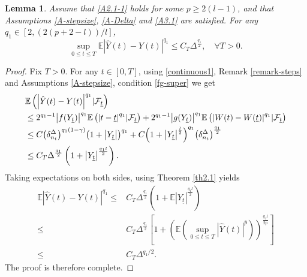 \documentclass[preprint,12pt,compress]{elsarticle}
\newtheorem{lemma}[theorem]{Lemma}%
\begin{document}
\begin{lemma}   \label{YYbar}
	Assume that \eqref{A2.1-1} holds for some $ p \ge 2(l-1)$, and that Assumptions \ref{A-stepsize}, \ref{A-Delta} and \ref{A3.1} are satisfied. For any ${q_1} \in [2, (2(p+2-l))/l]$, 
	\begin{equation*}
		\mathop {\sup }\limits_{0 \le t \le T} \mathbb{E}{\left| {\hat Y(t) - Y(t)} \right|^{{q_1}}} \le {C_T}{\Delta ^{\frac{{{q_1}}}{2}}}, \quad \forall T > 0.
	\end{equation*}
\end{lemma}
\begin{proof}
Fix $T > 0$. For any $t \in [0, T]$, using \eqref{continuous1}, Remark \ref{remark-steps} and Assumptions \ref{A-stepsize}, condition \eqref{fg-super} we get
\begin{equation*}
	\begin{split}
		&\mathbb{E}\left( {{{\left| {\hat Y(t) - Y(t)} \right|}^{{q_1}}}|{{\cal F}_{{\underline{t}}}}} \right) \\
		&\le {2^{{q_1} - 1}}{\left| {f({Y_{{\underline{t}}}})} \right|^{{q_1}}}\mathbb{E}\left( {{{\left| {t - {\underline{t}}} \right|}^{{q_1}}}|{{\cal F}_{{\underline{t}}}}} \right) + {2^{{q_1} - 1}}{\left| {g({Y_{{\underline{t}}}})} \right|^{{q_1}}}\mathbb{E}\left( {{{\left| {W(t) - W({\underline{t}})} \right|}^{{q_1}}}|{{\cal F}_{{\underline{t}}}}} \right) \\
		&\le C{\left( {\delta _{{n_t}}^\Delta } \right)^{{q_1}(1 - \gamma )}}{\left( {1 + \left| {{Y_{{\underline{t}}}}} \right|} \right)^{{q_1}}} + C{\left( {1 + {{\left| {{Y_{{\underline{t}}}}} \right|}^{\frac{l}{2}}}} \right)^{{q_1}}}{\left( {\delta _{{n_t}}^\Delta } \right)^{\frac{{{q_1}}}{2}}} \\
		&\le C_T{\Delta ^{\frac{{{q_1}}}{2}}}\left( {1 + {{\left| {{Y_{{\underline{t}}}}} \right|}^{\frac{{{q_1}l}}{2}}}} \right).
	\end{split}
\end{equation*}
Taking expectations on both sides, using Theorem \ref{th2.1} yields
\begin{equation*}
	\begin{split}
		\mathbb{E}{\left| {\hat Y(t) - Y(t)} \right|^{{q_1}}} 
		\le& {C_T}{\Delta ^{\frac{{{q_1}}}{2}}}\left( {1 + \mathbb{E}{{\left| {{Y_{{\underline{t}}}}} \right|}^{\frac{{{q_1}l}}{2}}}} \right)\\
		\le& {C_T}{\Delta ^{\frac{{{q_1}}}{2}}}\left[ {1 + {{\left( {\mathbb{E}\left( {\mathop {\sup }\limits_{0 \le t \le T} {{\left| {\hat Y(t)} \right|}^{\bar p}}} \right)} \right)}^{\frac{{{q_1}l}}{{2\bar p}}}}} \right] \\
		\le& {C_T}{\Delta ^{{{{q_1}}}/{2}}} .
	\end{split}
\end{equation*}
The proof is therefore complete.
\end{proof}
\end{document}
